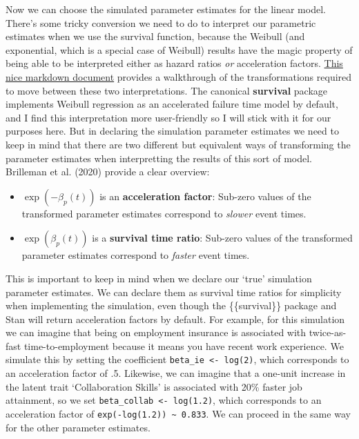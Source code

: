 \documentclass[
  letterpaper,
  DIV=11,
  numbers=noendperiod]{scrreprt}
\providecommand{\tightlist}{%
  \setlength{\itemsep}{0pt}\setlength{\parskip}{0pt}}\usepackage{longtable,booktabs,array}
\begin{document}
Now we can choose the simulated parameter estimates for the linear
model. There's some tricky conversion we need to do to interpret our
parametric estimates when we use the survival function, because the
Weibull (and exponential, which is a special case of Weibull) results
have the magic property of being able to be interpreted either as hazard
ratios \emph{or} acceleration factors.
\href{https://rstudio-pubs-static.s3.amazonaws.com/5564_bc9e2d9a458c4660aa82882df90b7a6b.html}{This
nice markdown document} provides a walkthrough of the transformations
required to move between these two interpretations. The canonical
\textbf{survival} package implements Weibull regression as an
accelerated failure time model by default, and I find this
interpretation more user-friendly so I will stick with it for our
purposes here. But in declaring the simulation parameter estimates we
need to keep in mind that there are two different but equivalent ways of
transforming the parameter estimates when interpretting the results of
this sort of model. Brilleman et al. (2020) provide a clear overview:

\begin{itemize}
\tightlist
\item
  \(\exp(-\beta_p(t))\) is an \textbf{acceleration factor}: Sub-zero
  values of the transformed parameter estimates correspond to
  \emph{slower} event times.
\item
  \(\exp(\beta_p(t))\) is a \textbf{survival time ratio}: Sub-zero
  values of the transformed parameter estimates correspond to
  \emph{faster} event times.
\end{itemize}

This is important to keep in mind when we declare our `true' simulation
parameter estimates. We can declare them as survival time ratios for
simplicity when implementing the simulation, even though the
\{\{survival\}\} package and Stan will return acceleration factors by
default. For example, for this simulation we can imagine that being on
employment insurance is associated with twice-as-fast time-to-employment
because it means you have recent work experience. We simulate this by
setting the coefficient \texttt{beta\_ie\ \textless{}-\ log(2)}, which
corresponds to an acceleration factor of .5. Likewise, we can imagine
that a one-unit increase in the latent trait `Collaboration Skills' is
associated with 20\% faster job attainment, so we set
\texttt{beta\_collab\ \textless{}-\ log(1.2)}, which corresponds to an
acceleration factor of
\texttt{exp(-log(1.2))\ \textasciitilde{}\ 0.833}. We can proceed in the
same way for the other parameter estimates.
\end{document}

